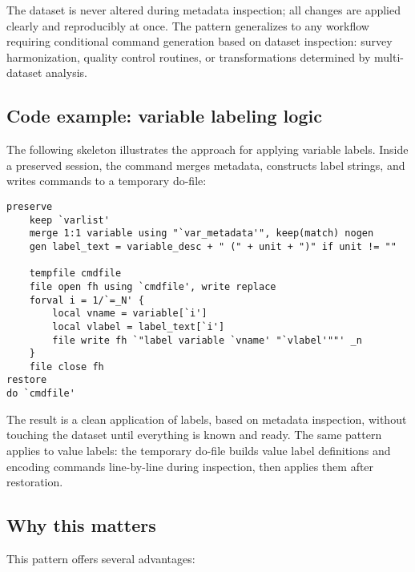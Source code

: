 The dataset is never altered during metadata inspection; all changes are applied clearly and reproducibly at once. The pattern generalizes to any workflow requiring conditional command generation based on dataset inspection: survey harmonization, quality control routines, or transformations determined by multi-dataset analysis.

\subsection{Code example: variable labeling logic}

The following skeleton illustrates the approach for applying variable labels. Inside a preserved session, the command merges metadata, constructs label strings, and writes commands to a temporary do-file:

\begin{stlog}
\begin{verbatim}
preserve
    keep `varlist'
    merge 1:1 variable using "`var_metadata'", keep(match) nogen
    gen label_text = variable_desc + " (" + unit + ")" if unit != ""

    tempfile cmdfile
    file open fh using `cmdfile', write replace
    forval i = 1/`=_N' {
        local vname = variable[`i']
        local vlabel = label_text[`i']
        file write fh `"label variable `vname' "`vlabel'""' _n
    }
    file close fh
restore
do `cmdfile'
\end{verbatim}
\end{stlog}

The result is a clean application of labels, based on metadata inspection, without touching the dataset until everything is known and ready. The same pattern applies to value labels: the temporary do-file builds value label definitions and encoding commands line-by-line during inspection, then applies them after restoration.

\subsection{Why this matters}

This pattern offers several advantages:


